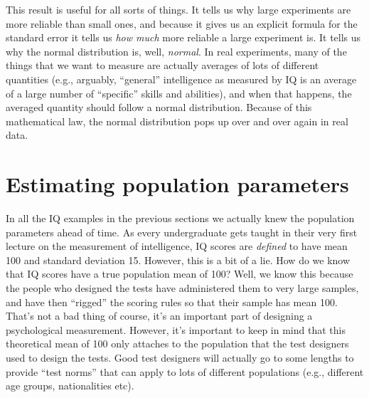 This result is useful for all sorts of things. It tells us why large experiments are more reliable than small ones, and because it gives us an explicit formula for the standard error it tells us {\it how much} more reliable a large experiment is. It tells us why the normal distribution is, well, {\it normal}. In real experiments, many of the things that we want to measure are actually averages of lots of different quantities (e.g., arguably, ``general'' intelligence as measured by IQ is an average of a large number of ``specific'' skills and abilities), and when that happens, the averaged quantity should follow a normal distribution. Because of this mathematical law, the normal distribution pops up over and over again in real data. 


\section{Estimating population parameters~\label{sec:pointestimates}}

In all the IQ examples in the previous sections we actually knew the population parameters ahead of time. As every undergraduate gets taught in their very first lecture on the measurement of intelligence, IQ scores are {\it defined} to have mean 100 and standard deviation 15. However, this is a bit of a lie. How do we know that IQ scores have a true population mean of 100? Well, we know this because the people who designed the tests have administered them to very large samples, and have then ``rigged'' the scoring rules so that their sample has mean 100. That's not a bad thing of course, it's an important part of designing a psychological measurement. However, it's important to keep in mind that this theoretical mean of 100 only attaches to the population that the test designers used to design the tests. Good test designers will actually go to some lengths to provide ``test norms'' that can apply to lots of different populations (e.g., different age groups, nationalities etc). 

